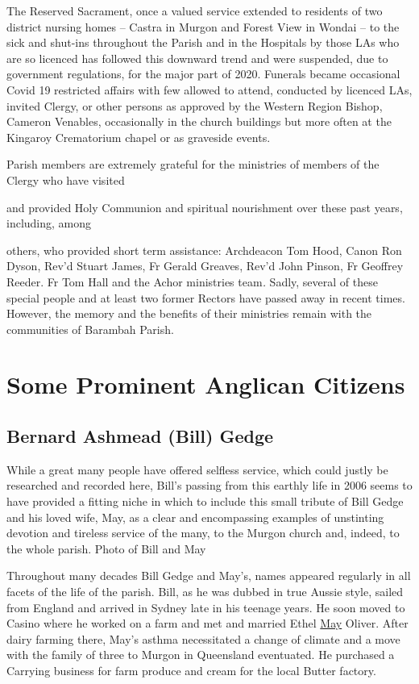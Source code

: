 The Reserved Sacrament, once a valued service extended to residents of two district nursing homes -- Castra in Murgon and Forest View in Wondai -- to the sick and shut-ins throughout the Parish and in the Hospitals by those LAs who are so licenced has followed this downward trend and were suspended, due to government regulations, for the major part of 2020. Funerals became occasional Covid 19 restricted affairs with few allowed to attend, conducted by licenced LAs, invited Clergy, or other persons as approved by the Western Region Bishop, Cameron Venables, occasionally in the church buildings but more often at the Kingaroy Crematorium chapel or as graveside events.

Parish members are extremely grateful for the ministries of members of the Clergy who have visited

and provided Holy Communion and spiritual nourishment over these past years, including, among

others, who provided short term assistance: Archdeacon Tom Hood, Canon Ron Dyson, Rev'd Stuart James, Fr Gerald Greaves, Rev'd John Pinson, Fr Geoffrey Reeder. Fr Tom Hall and the Achor ministries team\emph{.} Sadly, several of these special people and at least two former Rectors have passed away in recent times. However, the memory and the benefits of their ministries remain with the communities of Barambah Parish.

\hypertarget{some-prominent-anglican-citizens}{%
\chapter{Some Prominent Anglican Citizens}\label{some-prominent-anglican-citizens}}

\hypertarget{bernard-ashmead-bill-gedge}{%
\section{Bernard Ashmead (Bill) Gedge}\label{bernard-ashmead-bill-gedge}}

While a great many people have offered selfless service, which could justly be researched and recorded here, Bill's passing from this earthly life in 2006 seems to have provided a fitting niche in which to include this small tribute of Bill Gedge and his loved wife, May, as a clear and encompassing examples of unstinting devotion and tireless service of the many, to the Murgon church and, indeed, to the whole parish. Photo of Bill and May

Throughout many decades Bill Gedge and May's, names appeared regularly in all facets of the life of the parish. Bill, as he was dubbed in true Aussie style, sailed from England and arrived in Sydney late in his teenage years. He soon moved to Casino where he worked on a farm and met and married Ethel \underline{May} Oliver. After dairy farming there, May's asthma necessitated a change of climate and a move with the family of three to Murgon in Queensland eventuated. He purchased a Carrying business for farm produce and cream for the local Butter factory.

